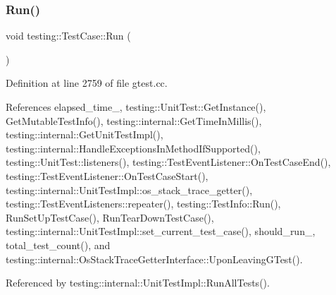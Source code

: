 \subsubsection{\texorpdfstring{Run()}{Run()}}
{\footnotesize\ttfamily void testing\+::\+Test\+Case\+::\+Run (\begin{DoxyParamCaption}{ }\end{DoxyParamCaption})\hspace{0.3cm}{\ttfamily [private]}}



Definition at line 2759 of file gtest.\+cc.



References elapsed\+\_\+time\+\_\+, testing\+::\+Unit\+Test\+::\+Get\+Instance(), Get\+Mutable\+Test\+Info(), testing\+::internal\+::\+Get\+Time\+In\+Millis(), testing\+::internal\+::\+Get\+Unit\+Test\+Impl(), testing\+::internal\+::\+Handle\+Exceptions\+In\+Method\+If\+Supported(), testing\+::\+Unit\+Test\+::listeners(), testing\+::\+Test\+Event\+Listener\+::\+On\+Test\+Case\+End(), testing\+::\+Test\+Event\+Listener\+::\+On\+Test\+Case\+Start(), testing\+::internal\+::\+Unit\+Test\+Impl\+::os\+\_\+stack\+\_\+trace\+\_\+getter(), testing\+::\+Test\+Event\+Listeners\+::repeater(), testing\+::\+Test\+Info\+::\+Run(), Run\+Set\+Up\+Test\+Case(), Run\+Tear\+Down\+Test\+Case(), testing\+::internal\+::\+Unit\+Test\+Impl\+::set\+\_\+current\+\_\+test\+\_\+case(), should\+\_\+run\+\_\+, total\+\_\+test\+\_\+count(), and testing\+::internal\+::\+Os\+Stack\+Trace\+Getter\+Interface\+::\+Upon\+Leaving\+G\+Test().



Referenced by testing\+::internal\+::\+Unit\+Test\+Impl\+::\+Run\+All\+Tests().


